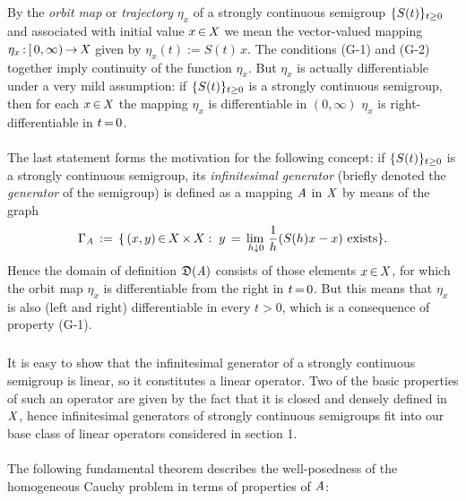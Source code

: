 \documentclass[11pt,twoside]{article}
\begin{document}
\subparagraph{} %
By the \textit{orbit map} or \textit{trajectory} $\eta_x$
of a strongly continuous semigroup $\{{S}(t)\}_{t \geq 0}$
and associated with initial value $x {\,\in\,} \mathit{X}$
we mean the vector-valued mapping $\eta_x {\,:\,} [\,0,\infty) {\,\to\,} \mathit{X}$
given by $\eta_x(t) := S(t) \, x$.
The conditions (G-1) and (G-2) together
imply continuity of the function $\eta_x$.
But $\eta_x$ is actually differentiable under a very mild assumption:
if $\{{S}(t)\}_{t \geq 0}$ is a strongly continuous semigroup,
then for each $x {\,\in\,} \mathit{X}$
the mapping $\eta_x$ is differentiable in $(0,\infty)$
\iff
$\eta_x$ is right-differentiable in $t {\,=\,} 0$.

\paragraph{} %
The last statement forms the motivation for the following concept:
if $\{{S}(t)\}_{t \geq 0}$ is a strongly continuous semigroup,
its \textit{infinitesimal generator}
(briefly denoted the \textit{generator} of the semigroup)
is defined as a mapping $\mathit{A}$ in $\mathit{X}$ by means of the graph
\[
\Gamma_{\mathit{A}} \,:=\,
\{\,(x,y) {\,\in\,} X {\,\times\,} X: \;
y \,=\, \lim_{\,h \downarrow 0} \, \frac{1}{h}({S}(h)x-x) \mbox{ exists} \}.
\]
Hence the domain of definition $\mathfrak{D}(\mathit{A})$ consists
of those elements $x {\,\in\,} \mathit{X}$,
for which the orbit map $\eta_x$ is differentiable from the right in $t {\,=\,} 0$.
But this means that
$\eta_x$ is also (left and right) differentiable in every $t>0$,
which is a consequence of property (G-1).

\subparagraph{} %
It is easy to show that
the infinitesimal generator of a strongly continuous semigroup is linear,
so it constitutes a linear operator.
Two of the basic properties of such an operator are given by the fact
that it is closed and densely defined in $\mathit{X}$,
hence infinitesimal generators of strongly continuous semigroups fit
into our base class of linear operators considered in section 1.

\paragraph{} %
The following fundamental theorem describes the well-posedness of the
homogeneous Cauchy problem in terms of properties of $\mathit{A}$:
\end{document}
